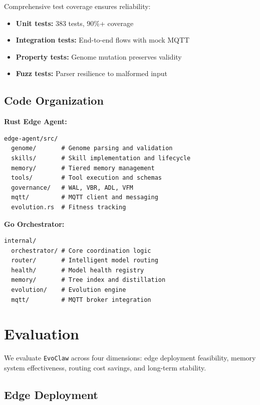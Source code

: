 \documentclass{article}
\newcommand{\evoclaw}{\texttt{EvoClaw}\xspace}
\begin{document}
Comprehensive test coverage ensures reliability:

\begin{itemize}[leftmargin=*]
    \item \textbf{Unit tests:} 383 tests, 90\%+ coverage
    \item \textbf{Integration tests:} End-to-end flows with mock MQTT
    \item \textbf{Property tests:} Genome mutation preserves validity
    \item \textbf{Fuzz tests:} Parser resilience to malformed input
\end{itemize}

\subsection{Code Organization}

\textbf{Rust Edge Agent:}
\begin{lstlisting}[basicstyle=\ttfamily\footnotesize]
edge-agent/src/
  genome/       # Genome parsing and validation
  skills/       # Skill implementation and lifecycle
  memory/       # Tiered memory management
  tools/        # Tool execution and schemas
  governance/   # WAL, VBR, ADL, VFM
  mqtt/         # MQTT client and messaging
  evolution.rs  # Fitness tracking
\end{lstlisting}

\textbf{Go Orchestrator:}
\begin{lstlisting}[basicstyle=\ttfamily\footnotesize]
internal/
  orchestrator/ # Core coordination logic
  router/       # Intelligent model routing
  health/       # Model health registry
  memory/       # Tree index and distillation
  evolution/    # Evolution engine
  mqtt/         # MQTT broker integration
\end{lstlisting}



\section{Evaluation}
\label{sec:evaluation}

We evaluate \evoclaw{} across four dimensions: edge deployment feasibility, memory system effectiveness, routing cost savings, and long-term stability.

\subsection{Edge Deployment}
\end{document}
